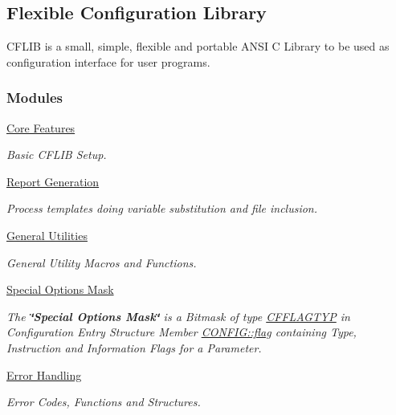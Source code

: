 \hypertarget{group__cflib}{\subsection{Flexible Configuration Library}
\label{group__cflib}
}


C\-F\-L\-I\-B is a small, simple, flexible and portable A\-N\-S\-I C Library to be used as configuration interface for user programs.  


\subsubsection*{Modules}
\begin{DoxyCompactItemize}
\item 
\hyperlink{group__cflib__core}{Core Features}
\begin{DoxyCompactList}\small\item\em Basic C\-F\-L\-I\-B Setup. \end{DoxyCompactList}\item 
\hyperlink{group__report__generation}{Report Generation}
\begin{DoxyCompactList}\small\item\em Process templates doing variable substitution and file inclusion. \end{DoxyCompactList}\item 
\hyperlink{group__utilities}{General Utilities}
\begin{DoxyCompactList}\small\item\em General Utility Macros and Functions. \end{DoxyCompactList}\item 
\hyperlink{group__special__options__mask}{Special Options Mask}
\begin{DoxyCompactList}\small\item\em The {\bfseries \char`\"{}\-Special Options Mask\char`\"{}} is a Bitmask of type \hyperlink{group__special__options__mask_ga4854f1596d5c6e0604a478fa9a2e23f0}{C\-F\-F\-L\-A\-G\-T\-Y\-P} in Configuration Entry Structure Member \hyperlink{struct_c_o_n_f_i_g_ab04d08abdf758c0400caaded716f4089}{C\-O\-N\-F\-I\-G\-::flag} containing Type, Instruction and Information Flags for a Parameter. \end{DoxyCompactList}\item 
\hyperlink{group__errors}{Error Handling}
\begin{DoxyCompactList}\small\item\em Error Codes, Functions and Structures. \end{DoxyCompactList}\item 

\end{DoxyCompactItemize}
